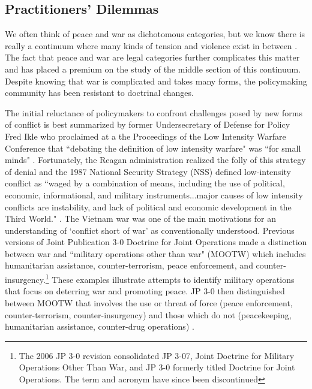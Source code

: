\documentclass[12pt,letterpaper]{article}
\begin{document}
	\subsection{Practitioners' Dilemmas}
		We often think of peace and war as dichotomous categories, but we know there is really a continuum where many kinds of tension and violence exist in between \citep{lebow_futurewar_2010}. The fact that peace and war are legal categories further complicates this matter and has placed a premium on the study of the middle section of this continuum. Despite knowing that war is complicated and takes many forms, the policymaking community has been resistant to doctrinal changes.
		
		The initial reluctance of policymakers to confront challenges posed by new forms of conflict is best summarized by former Undersecretary of Defense for Policy Fred Ikle who proclaimed at a the Proceedings of the Low Intensity Warfare Conference that ``debating the definition of low intensity warfare" was ``for small minds" \citep{schultz_lowintensitywarfarechallenge_1986}. Fortunately, the Reagan administration realized the folly of this strategy of denial and the 1987 National Security Strategy (NSS) defined low-intensity conflict as ``waged by a combination of means, including the use of political, economic, informational, and military instruments...major causes of low intensity conflicts are instability, and lack of political and economic development in the Third World." \citep{schultz_lowintensitywarfarechallenge_1986}. The Vietnam war was one of the main motivations for an understanding of `conflict short of war' as conventionally understood. Previous versions of Joint Publication 3-0 Doctrine for Joint Operations made a distinction between war and ``military operations other than war" (MOOTW) which includes humanitarian assistance, counter-terrorism, peace enforcement, and counter-insurgency.\footnote{The 2006 JP 3-0 revision consolidated JP 3-07, Joint Doctrine for Military Operations Other Than War, and JP 3-0 formerly titled Doctrine for Joint Operations. The term and acronym have since been discontinued} These examples illustrate attempts to identify military operations that focus on deterring war and promoting peace. JP 3-0 then distinguished between MOOTW that involves the use or threat of force (peace enforcement, counter-terrorism, counter-insurgency) and those which do not (peacekeeping, humanitarian assistance, counter-drug operations) \citep{kinross_clausewitzlowintensityconflict_2004}.
		
\end{document}
